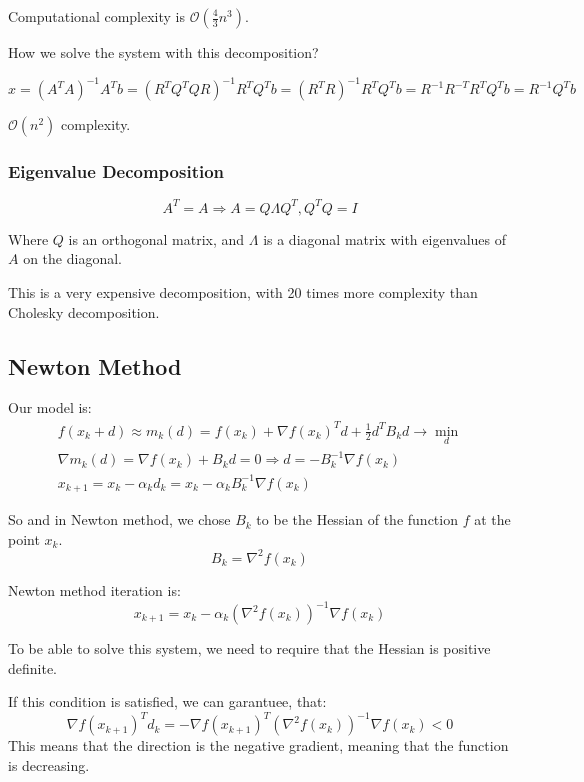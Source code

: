 \notice \; Computational complexity is $\mathcal{O}(\frac{4}{3} n^3)$.

How we solve the system with this decomposition?

\[ 
    x = (A^T A)^{-1} A^T b = (R^T Q^T Q R)^{-1} R^T Q^T b = (R^T R)^{-1} R^T Q^T b = R^{-1} R^{-T} R^T Q^T b = R^{-1} Q^T b
\] 

\notice \; $\mathcal{O}(n^2)$ complexity.

\subsubsection{Eigenvalue Decomposition}

\[
    A^T = A \Rightarrow A = Q \Lambda Q^T, Q^T Q = I
\]

Where $Q$ is an orthogonal matrix, and $\Lambda$ is a diagonal matrix with eigenvalues of $A$ on the diagonal.

\notice \; This is a very expensive decomposition, with 20 times more complexity than Cholesky decomposition. 

\subsection{Newton Method}

Our model is: 
\begin{gather*}
    f(x_k + d) \approx m_k(d) = f(x_k) + \nabla f(x_k)^T d + \frac{1}{2} d^T B_k d \to \min_d \\ 
    \nabla m_k(d) = \nabla f(x_k) + B_k d = 0 \Longrightarrow d = -B_k^{-1} \nabla f(x_k) \\ 
    x_{k+1} = x_k - \alpha_k d_k = x_k - \alpha_k B_k^{-1} \nabla f(x_k)
\end{gather*}

So and in Newton method, we chose $B_k$ to be the Hessian of the function $f$ at the point $x_k$.
\[ 
    B_k = \nabla^2 f(x_k)
\]

Newton method iteration is: 
\[ 
    x_{k+1} = x_k - \alpha_k (\nabla^2 f(x_k))^{-1} \nabla f(x_k)
\]

To be able to solve this system, we need to require that the Hessian is positive definite. 

If this condition is satisfied, we can garantuee, that: 
\[
    \nabla f(x_{k+1})^T d_k = - \nabla f(x_{k+1})^T (\nabla^2 f(x_k))^{-1} \nabla f(x_k) < 0
\]
This means that the direction is the negative gradient, meaning that the function is decreasing.


